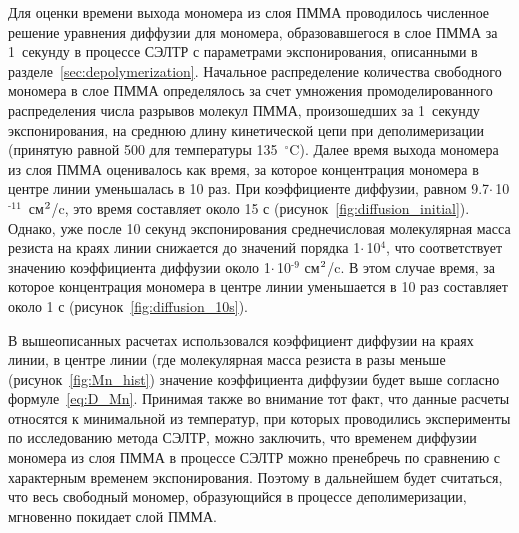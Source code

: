 Для оценки времени выхода мономера из слоя ПММА проводилось численное решение уравнения диффузии для мономера, образовавшегося в слое ПММА за 1~секунду в процессе СЭЛТР с параметрами экспонирования, описанными в разделе~\ref{sec:depolymerization}.
Начальное распределение количества свободного мономера в слое ПММА определялось за счет умножения промоделированного распределения числа разрывов молекул ПММА, произошедших за 1~секунду экспонирования, на среднюю длину кинетической цепи при деполимеризации (принятую равной 500 для температуры 135~$^\circ$C).
Далее время выхода мономера из слоя \linebreak ПММА оценивалось как время, за которое концентрация мономера в центре линии уменьшалась в 10 раз.
При коэффициенте диффузии, равном 9.7\:$\cdot$\,10$^\text{-11}$~см$^\text{2}$/c, это время составляет около 15 с (рисунок~\ref{fig:diffusion_initial}).
Однако, уже после 10 секунд экспонирования среднечисловая молекулярная масса резиста на краях линии снижается до значений порядка 1\:$\cdot$\,10$^\text{4}$, что соответствует значению коэффициента диффузии около 1\:$\cdot$\,10$^\text{-9}$ см$^\text{2}$/c.
В этом случае время, за которое концентрация мономера в центре линии уменьшается в 10 раз составляет около 1 с (рисунок~\ref{fig:diffusion_10s}).

В вышеописанных расчетах использовался коэффициент диффузии на краях линии, в центре линии (где молекулярная масса резиста в разы меньше (рисунок~\ref{fig:Mn_hist}) значение коэффициента диффузии будет выше согласно формуле~\ref{eq:D_Mn}.
Принимая также во внимание тот факт, что данные расчеты относятся к минимальной из температур, при которых проводились эксперименты по исследованию метода СЭЛТР, можно заключить, что временем диффузии мономера из слоя ПММА в процессе СЭЛТР можно пренебречь по сравнению с характерным временем экспонирования.
Поэтому в дальнейшем будет считаться, что весь свободный мономер, образующийся в процессе деполимеризации, мгновенно покидает слой ПММА.


